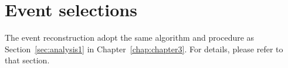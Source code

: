 \section{Event selections}
\label{sec:analysisEXO-14-009}


The event reconstruction adopt the same algorithm and procedure as
Section~\ref{sec:analysis1} in Chapter~\ref{chap:chapter3}. For details, please refer to that section.  




